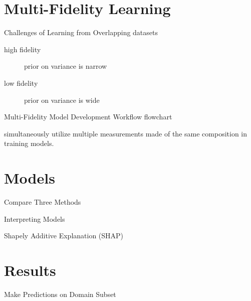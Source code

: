 \documentclass[10pt, aspectratio=169, presentation]{beamer}
\begin{document}
\section{Multi-Fidelity Learning}
\label{sec:orgea80fb5}
\begin{frame}[label={sec:org89ec1aa}]{Challenges of Learning from Overlapping datasets}
\begin{description}
\item[{high fidelity}] prior on variance is narrow
\item[{low fidelity}] prior on variance is wide
\end{description}
\end{frame}

\begin{frame}[label={sec:orga754722}]{Multi-Fidelity Model Development Workflow}
\alert{flowchart}

simultaneously utilize multiple measurements made of the same
composition in training models.\autocite{manganaris-2022-mrs-comput}
\end{frame}

\section{Models}
\label{sec:org98f5768}
\begin{frame}[label={sec:orgbd012ff}]{Compare Three Methods}
\end{frame}
\begin{frame}[label={sec:orgf43f51d}]{Interpreting Models}
\end{frame}
\begin{frame}[label={sec:org4d6b75b}]{Shapely Additive Explanation (SHAP)}
\end{frame}
\section{Results}
\label{sec:orgdebc8bf}
\begin{frame}[label={sec:orgcfbe984}]{Make Predictions on Domain Subset}
\end{frame}
\end{document}
